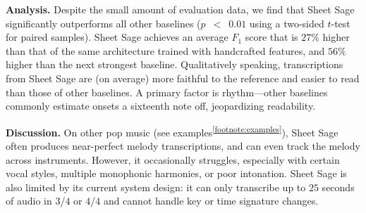 \documentclass{article}
\begin{document}
\textbf{Analysis.} Despite the small amount of evaluation data, we find that Sheet Sage significantly outperforms all other baselines ($p$~$<$~$0.01$ using a two-sided $t$-test for paired samples). 
Sheet Sage achieves an average $F_1$ score that is 
$27\%$ higher than that of the same architecture trained with handcrafted features, 
and 
$56\%$ higher than the next strongest baseline. 
Qualitatively speaking, 
transcriptions from Sheet Sage are (on average) more faithful to the reference and easier to read than those of other baselines. 
A primary factor is rhythm---other baselines commonly estimate onsets a sixteenth note off, jeopardizing readability.

\textbf{Discussion.}
On other pop music (see examples\textsuperscript{\ref{footnote:examples}}), Sheet Sage often produces near-perfect melody transcriptions, and can even track the melody across instruments. 
However, it occasionally struggles, especially with 
certain vocal styles,
multiple monophonic harmonies, 
or
poor intonation. 
Sheet Sage is also limited by its current system design: 
it can only transcribe up to $25$ seconds of audio in $3$/$4$ or $4$/$4$ and cannot handle key or time signature changes.


\clearpage




\end{document}
